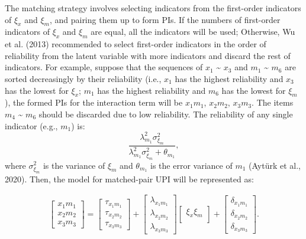 \documentclass[
  11pt,
  man]{apa6}
\begin{document}
The matching strategy involves selecting indicators from the first-order indicators of \(\xi_{x}\) and \(\xi_{m}\), and pairing them up to form PIs. If the numbers of first-order indicators of \(\xi_{x}\) and \(\xi_{m}\) are equal, all the indicators will be used; Otherwise, Wu et al. (2013) recommended to select first-order indicators in the order of reliability from the latent variable with more indicators and discard the rest of indicators. For example, suppose that the sequences of \(x_{1}\) \textasciitilde{} \(x_{3}\) and \(m_{1}\) \textasciitilde{} \(m_{6}\) are sorted decreasingly by their reliability (i.e., \(x_{1}\) has the highest reliability and \(x_{3}\) has the lowest for \(\xi_{x}\); \(m_{1}\) has the highest reliability and \(m_{6}\) has the lowest for \(\xi_{m}\)), the formed PIs for the interaction term will be \(x_{1}m_{1}\), \(x_{2}m_{2}\), \(x_{3}m_{3}\). The items \(m_{4}\) \textasciitilde{} \(m_{6}\) should be discarded due to low reliability. The reliability of any single indicator (e.g., \(m_{1}\)) is:
\begin{equation}
\frac{\lambda_{m_{1}}^2\sigma_{\xi_{m}}^2}{\lambda_{m_{1}}^2\sigma_{\xi_{m}}^2 + \theta_{m_{1}}},
\end{equation}
where \(\sigma_{\xi_{m}}^2\) is the variance of \(\xi_{m}\) and \(\theta_{m_{1}}\) is the error variance of \(m_{1}\) (Aytürk et al., 2020). Then, the model for matched-pair UPI will be represented as:

\begin{align}
    \begin{bmatrix}
        x_{1}m_{1} \\
        x_{2}m_{2} \\
        x_{3}m_{3}
    \end{bmatrix} =
    \begin{bmatrix}
        \tau_{x_{1}m_{1}} \\
        \tau_{x_{2}m_{2}} \\ 
        \tau_{x_{3}m_{3}}
    \end{bmatrix} + 
    \begin{bmatrix}
        \lambda_{x_{1}m_{1}} \\
        \lambda_{x_{2}m_{2}} \\ 
        \lambda_{x_{3}m_{3}} 
    \end{bmatrix}
    \begin{bmatrix}
        \xi_{x}\xi_{m} \\
    \end{bmatrix} +
    \begin{bmatrix}
        \delta_{x_{1}m_{1}} \\
        \delta_{x_{2}m_{2}} \\ 
        \delta_{x_{3}m_{3}}
    \end{bmatrix}.
\end{align}
\end{document}
